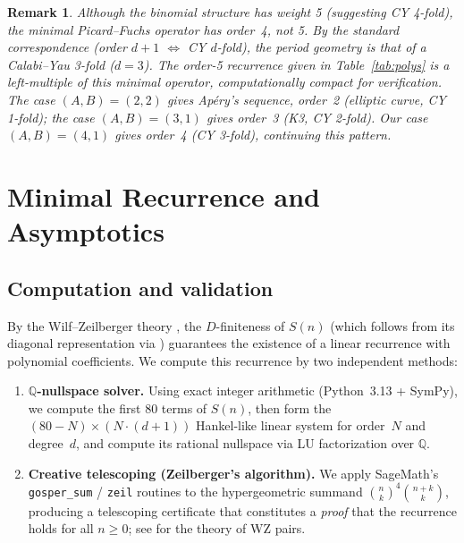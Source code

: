 \documentclass[11pt, a4paper]{article}
\newtheorem{remark}[theorem]{Remark}
\begin{document}
\begin{remark}
Although the binomial structure has weight 5 (suggesting CY 4-fold),
the minimal Picard--Fuchs operator has order~4, not 5. By the
standard correspondence (order $d+1$ $\Leftrightarrow$ CY $d$-fold),
the period geometry is that of a Calabi--Yau 3-fold ($d=3$).
The order-5 recurrence given in Table~\ref{tab:polys} is a left-multiple
of this minimal operator, computationally compact for verification.
The case $(A,B)=(2,2)$ gives Ap\'ery's sequence, order~2 (elliptic curve,
CY 1-fold); the case $(A,B)=(3,1)$ gives order~3 (K3, CY 2-fold).
Our case $(A,B)=(4,1)$ gives order~4 (CY 3-fold), continuing this pattern.
\end{remark}


\section{Minimal Recurrence and Asymptotics}\label{sec:recurrence}

\subsection{Computation and validation}

By the Wilf--Zeilberger theory \cite{PetkovsekWilfZeilberger1996}, the
$D$-finiteness of $S(n)$ (which follows from its diagonal representation
via \cite{LipshitzPoorten1990}) guarantees the existence of a linear
recurrence with polynomial coefficients.  We compute this recurrence
by two independent methods:

\begin{enumerate}
  \item \textbf{$\mathbb{Q}$-nullspace solver.}
        Using exact integer arithmetic (Python~3.13 + SymPy), we compute
        the first 80 terms of $S(n)$, then form the $(80-N)\times(N\cdot(d+1))$
        Hankel-like linear system for order~$N$ and degree~$d$, and compute
        its rational nullspace via LU factorization over $\mathbb{Q}$.
  \item \textbf{Creative telescoping (Zeilberger's algorithm).}
        We apply SageMath's \texttt{gosper\_sum} / \texttt{zeil} routines to
        the hypergeometric summand $\binom{n}{k}^4\binom{n+k}{k}$, producing
        a telescoping certificate that constitutes a \emph{proof} that the
        recurrence holds for all $n\ge 0$; see \cite{PetkovsekWilfZeilberger1996}
        for the theory of WZ pairs.
\end{enumerate}
\end{document}
